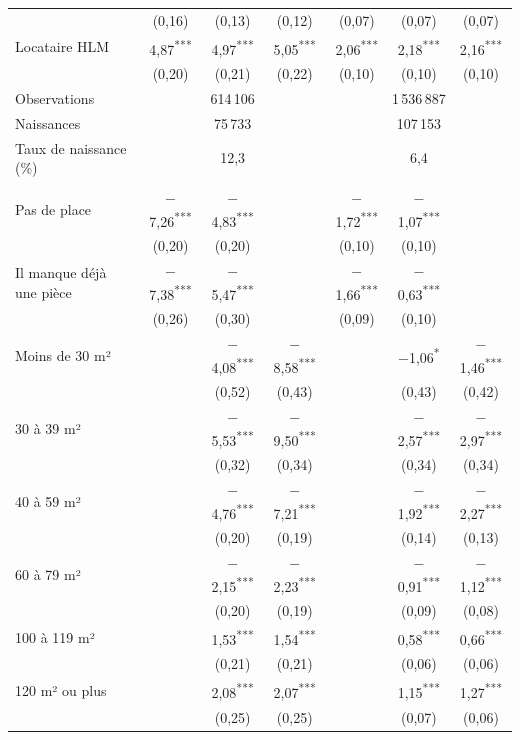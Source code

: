 \documentclass[11pt,a4paper]{article}
\theoremstyle{plain}
\theoremstyle{definition}
\theoremstyle{remark}
\newcommand{\sym}[1]{\textsuperscript{#1}}
\begin{document}
\begin{table}[p]
\begin{threeparttable}
\begin{tabular}{@{}lcccccc@{}}
  & (0,16) & (0,13) & (0,12) & (0,07) & (0,07) & (0,07) \\
Locataire HLM & 4,87\sym{***} & 4,97\sym{***} & 5,05\sym{***} & 2,06\sym{***} & 2,18\sym{***} & 2,16\sym{***} \\
  & (0,20) & (0,21) & (0,22) & (0,10) & (0,10) & (0,10) \\
Observations & \multicolumn{3}{c}{614\,106} & \multicolumn{3}{c}{1\,536\,887} \\
Naissances & \multicolumn{3}{c}{75\,733} & \multicolumn{3}{c}{107\,153} \\
Taux de naissance (\%) & \multicolumn{3}{c}{12,3} & \multicolumn{3}{c}{6,4} \\
\addlinespace
\multicolumn{7}{@{}l}{\textit{B. RP 2023 (enquêtes 2021 à 2025)}} \\
Pas de place & $-$7,26\sym{***} & $-$4,83\sym{***} &  & $-$1,72\sym{***} & $-$1,07\sym{***} &  \\
  & (0,20) & (0,20) &  & (0,10) & (0,10) &  \\
Il manque déjà une pièce & $-$7,38\sym{***} & $-$5,47\sym{***} &  & $-$1,66\sym{***} & $-$0,63\sym{***} &  \\
  & (0,26) & (0,30) &  & (0,09) & (0,10) &  \\
Moins de 30 m² &  & $-$4,08\sym{***} & $-$8,58\sym{***} &  & $-$1,06\sym{*} & $-$1,46\sym{***} \\
  &  & (0,52) & (0,43) &  & (0,43) & (0,42) \\
30 à 39 m² &  & $-$5,53\sym{***} & $-$9,50\sym{***} &  & $-$2,57\sym{***} & $-$2,97\sym{***} \\
  &  & (0,32) & (0,34) &  & (0,34) & (0,34) \\
40 à 59 m² &  & $-$4,76\sym{***} & $-$7,21\sym{***} &  & $-$1,92\sym{***} & $-$2,27\sym{***} \\
  &  & (0,20) & (0,19) &  & (0,14) & (0,13) \\
60 à 79 m² &  & $-$2,15\sym{***} & $-$2,23\sym{***} &  & $-$0,91\sym{***} & $-$1,12\sym{***} \\
  &  & (0,20) & (0,19) &  & (0,09) & (0,08) \\
100 à 119 m² &  & 1,53\sym{***} & 1,54\sym{***} &  & 0,58\sym{***} & 0,66\sym{***} \\
  &  & (0,21) & (0,21) &  & (0,06) & (0,06) \\
120 m² ou plus &  & 2,08\sym{***} & 2,07\sym{***} &  & 1,15\sym{***} & 1,27\sym{***} \\
  &  & (0,25) & (0,25) &  & (0,07) & (0,06) \\

\end{tabular}
\end{threeparttable}
\end{table}
\end{document}
